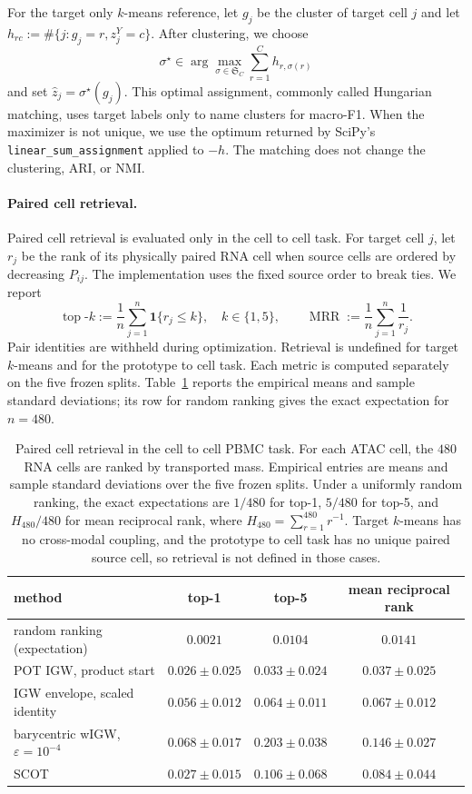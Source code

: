 \documentclass[11pt]{article}
\theoremstyle{plain}
\theoremstyle{definition}
\theoremstyle{remark}
\begin{document}
For the target only \(k\)-means reference, let \(g_j\) be the cluster of target
cell \(j\) and let
\(h_{rc}:=\#\{j:g_j=r,z_j^Y=c\}\). After clustering, we choose
\[
 \sigma^\star\in\arg\max_{\sigma\in\mathfrak S_C}
 \sum_{r=1}^C h_{r,\sigma(r)}
\]
and set \(\widehat z_j=\sigma^\star(g_j)\). This optimal assignment, commonly
called Hungarian matching, uses target labels only to name clusters for
macro-F1. When the maximizer is not unique, we use the optimum returned by
SciPy's \texttt{linear\_sum\_assignment} applied to \(-h\). The matching does
not change the clustering, ARI, or NMI.

\paragraph{Paired cell retrieval.}
Paired cell retrieval is evaluated only in the cell to cell task. For target
cell \(j\), let \(r_j\) be the rank of its physically paired RNA cell when
source cells are ordered by decreasing \(P_{ij}\). The implementation uses the
fixed source order to break ties. We report
\[
 \operatorname{top}\text{-}k
 :=\frac1n\sum_{j=1}^n\mathbf 1\{r_j\le k\},
 \quad k\in\{1,5\},
 \qquad
 \operatorname{MRR}:=\frac1n\sum_{j=1}^n\frac1{r_j}.
\]
Pair identities are withheld during optimization. Retrieval is undefined for
target \(k\)-means and for the prototype to cell task. Each metric is
computed separately on the five frozen splits. Table~\ref{tab:pbmc-pair-retrieval}
reports the empirical means and sample standard deviations; its row for random ranking
gives the exact expectation for \(n=480\).

\begin{table}[H]
\centering
\footnotesize
\renewcommand{\arraystretch}{1.08}
\begin{tabular}{@{}lccc@{}}
\toprule
method & top-1 & top-5 & mean reciprocal rank\\
\midrule
random ranking (expectation)
 & \(0.0021\) & \(0.0104\) & \(0.0141\)\\
\addlinespace[.2em]
POT IGW, product start
 & \(0.026\pm0.025\) & \(0.033\pm0.024\) & \(0.037\pm0.025\)\\
IGW envelope, scaled identity
 & \(0.056\pm0.012\) & \(0.064\pm0.011\) & \(0.067\pm0.012\)\\
barycentric wIGW, \(\varepsilon=10^{-4}\)
 & \(\mathbf{0.068\pm0.017}\) & \(\mathbf{0.203\pm0.038}\) &
   \(\mathbf{0.146\pm0.027}\)\\
SCOT
 & \(0.027\pm0.015\) & \(0.106\pm0.068\) & \(0.084\pm0.044\)\\
\bottomrule
\end{tabular}
\caption{Paired cell retrieval in the cell to cell PBMC task. For each ATAC
cell, the \(480\) RNA cells are ranked by transported mass. Empirical entries
are means and sample standard deviations over the five frozen splits. Under a
uniformly random ranking, the exact expectations are \(1/480\) for top-1,
\(5/480\) for top-5, and \(H_{480}/480\) for mean reciprocal rank, where
\(H_{480}=\sum_{r=1}^{480}r^{-1}\). Target \(k\)-means has no cross-modal
coupling, and the prototype to cell task has no unique paired source cell, so
retrieval is not defined in those cases.}
\label{tab:pbmc-pair-retrieval}
\end{table}

\small

\end{document}
